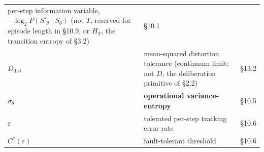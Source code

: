 \documentclass[11pt]{article}
\begin{document}
\begin{longtable}[]{@{}lll@{}}
\begin{minipage}[t]{0.30\columnwidth}
per-step information variable, \(-\log_2P(S'_\theta\mid S_\theta)\) (not \(T\), reserved for episode length in \S{}10.9, or \(H_T\), the transition entropy of \S{}3.2)\strut
\end{minipage} & \begin{minipage}[t]{0.30\columnwidth}\raggedright
\S{}10.1\strut
\end{minipage}\tabularnewline
\begin{minipage}[t]{0.30\columnwidth}\raggedright
\(D_{\mathrm{dist}}\)\strut
\end{minipage} & \begin{minipage}[t]{0.30\columnwidth}\raggedright
mean-squared distortion tolerance (continuum limit; not \(D\), the deliberation primitive of \S{}2.2)\strut
\end{minipage} & \begin{minipage}[t]{0.30\columnwidth}\raggedright
\S{}13.2\strut
\end{minipage}\tabularnewline
\begin{minipage}[t]{0.30\columnwidth}\raggedright
\(\sigma_\theta\)\strut
\end{minipage} & \begin{minipage}[t]{0.30\columnwidth}\raggedright
\textbf{operational variance-entropy}\strut
\end{minipage} & \begin{minipage}[t]{0.30\columnwidth}\raggedright
\S{}10.5\strut
\end{minipage}\tabularnewline
\begin{minipage}[t]{0.30\columnwidth}\raggedright
\(\varepsilon\)\strut
\end{minipage} & \begin{minipage}[t]{0.30\columnwidth}\raggedright
tolerated per-step tracking error rate\strut
\end{minipage} & \begin{minipage}[t]{0.30\columnwidth}\raggedright
\S{}10.6\strut
\end{minipage}\tabularnewline
\begin{minipage}[t]{0.30\columnwidth}\raggedright
\(C^*(\varepsilon)\)\strut
\end{minipage} & \begin{minipage}[t]{0.30\columnwidth}\raggedright
fault-tolerant threshold\strut
\end{minipage} & \begin{minipage}[t]{0.30\columnwidth}\raggedright
\S{}10.6\strut
\end{minipage}\tabularnewline

\end{longtable}
\end{document}
